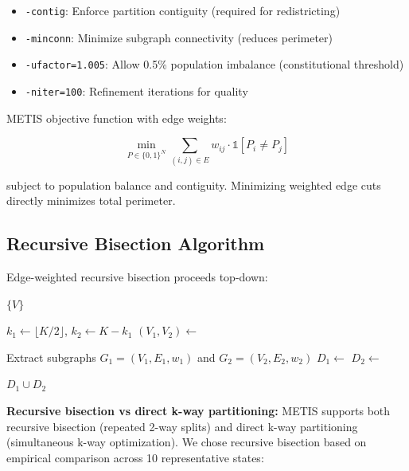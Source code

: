 \begin{itemize}
    \item \texttt{-contig}: Enforce partition contiguity (required for redistricting)
    \item \texttt{-minconn}: Minimize subgraph connectivity (reduces perimeter)
    \item \texttt{-ufactor=1.005}: Allow 0.5\% population imbalance (constitutional threshold)
    \item \texttt{-niter=100}: Refinement iterations for quality
\end{itemize}

METIS objective function with edge weights:

\begin{equation}
    \min_{P \in \{0,1\}^N} \sum_{(i,j) \in E} w_{ij} \cdot \mathbb{1}[P_i \neq P_j]
\end{equation}

subject to population balance and contiguity. Minimizing weighted edge cuts directly minimizes total perimeter.

\subsection{Recursive Bisection Algorithm}

Edge-weighted recursive bisection proceeds top-down:

\begin{algorithm}
\caption{Edge-Weighted Recursive Bisection}
\begin{algorithmic}[1]
        \State \Return $\{V\}$ 
    \EndIf

    \State $k_1 \gets \lfloor K/2 \rfloor$, $k_2 \gets K - k_1$ 
    \State $(V_1, V_2) \gets$ 

    \State Extract subgraphs $G_1 = (V_1, E_1, w_1)$ and $G_2 = (V_2, E_2, w_2)$
    \State $D_1 \gets$ 
    \State $D_2 \gets$ 

    \State \Return $D_1 \cup D_2$
\EndFunction
\end{algorithmic}
\end{algorithm}

\textbf{Recursive bisection vs direct k-way partitioning:} METIS supports both recursive bisection (repeated 2-way splits) and direct k-way partitioning (simultaneous k-way optimization). We chose recursive bisection based on empirical comparison across 10 representative states:


